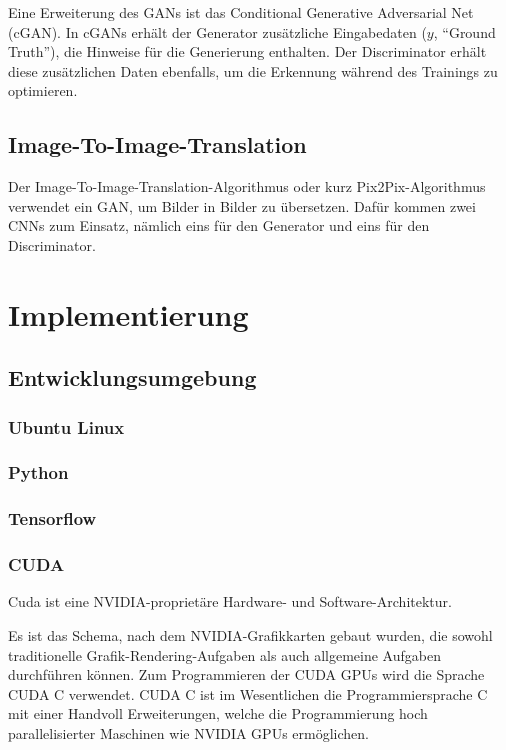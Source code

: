 Eine Erweiterung des GANs ist das Conditional Generative Adversarial Net (cGAN). In cGANs erhält der Generator zusätzliche Eingabedaten ($y$, ``Ground Truth''), die Hinweise für die Generierung enthalten. Der Discriminator erhält diese zusätzlichen Daten ebenfalls, um die Erkennung während des Trainings zu optimieren. \cite{mirza2014conditional}

\section{Image-To-Image-Translation}
\label{sec:pix2pix}
Der Image-To-Image-Translation-Algorithmus oder kurz Pix2Pix-Algorithmus verwendet
ein GAN, um Bilder in Bilder zu übersetzen. Dafür kommen zwei CNNs zum Einsatz, nämlich eins für den Generator und eins für den Discriminator.

\chapter{Implementierung}

\section{Entwicklungsumgebung}
\label{sec:env}

\subsection{Ubuntu Linux}
\label{subsec:ubuntu}

\subsection{Python}
\label{subsec:python}

\subsection{Tensorflow}
\label{subsec:tensorflow}

\subsection{CUDA}
\label{subsec:cuda}
Cuda ist eine NVIDIA-proprietäre Hardware- und Software-Architektur.

Es ist das Schema, nach dem NVIDIA-Grafikkarten gebaut wurden, die sowohl traditionelle Grafik-Rendering-Aufgaben als auch allgemeine Aufgaben durchführen können. Zum Programmieren der CUDA GPUs wird die Sprache CUDA C verwendet. CUDA C ist im Wesentlichen die Programmiersprache C mit einer Handvoll Erweiterungen, welche die Programmierung hoch parallelisierter Maschinen wie NVIDIA GPUs ermöglichen. \cite{sanders2010cuda}

